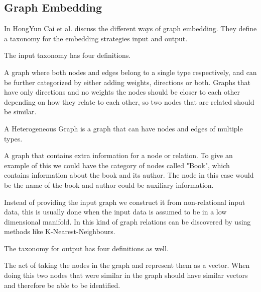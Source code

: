 \subsection{Graph Embedding}
In \cite{8294302} HongYun Cai et al. discuss the different ways of graph embedding. They define a taxonomy for the embedding strategies input and output.

The input taxonomy has four definitions.  

\begin{definition} A graph where both nodes and edges belong to a single type respectively, and can be further categorized by either adding weights, directions or both. Graphs that have only directions and no weights the nodes should be closer to each other depending on how they relate to each other, so two nodes that are related should be similar.
\end{definition}

\begin{definition} A Heterogeneous Graph is a graph that can have nodes and edges of multiple types. 
\end{definition}

\begin{definition} A graph that contains extra information for a node or relation. To give an example of this we could have the category of nodes called "Book", which contains information about the book and its author. The node in this case would be the name of the book and author could be auxiliary information.
\end{definition}

\begin{definition} Instead of providing the input graph we construct it from non-relational input data, this is usually done when the input data is assumed to be in a low dimensional manifold. In this kind of graph relations can be discovered by using methods like K-Nearest-Neighbours.
\end{definition}

The taxonomy for output has four definitions as well.

\begin{definition} The act of taking the nodes in the graph and represent them as a vector. When doing this two nodes that were similar in the graph should have similar vectors and therefore be able to be identified.
\end{definition}

